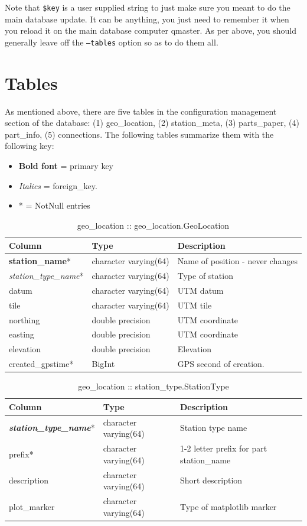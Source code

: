 \documentclass{article}
\begin{document}
Note that {\tt \$key} is a user supplied string to just make sure you meant to do the main database update.  It can be anything, you
just need to remember it when you reload it on the main database computer qmaster.
As per above, you should generally leave off the {\tt --tables} option so as to do them all.  

\section{Tables}
As mentioned above, there are five tables in the configuration management section of the database:  (1) geo\_location, (2) station\_meta,
(3) parts\_paper, (4) part\_info, (5) connections.  The following tables summarize them with the following key:  
\begin{itemize}\setlength\itemsep{-.3em}
	\item {\bf Bold font} = primary key
	\item {\em Italics} = foreign\_key.
	\item * = NotNull entries
\end{itemize}

\begin{table}[h]
\centering
\caption{geo\_location :: geo\_location.GeoLocation}
\begin{tabular}{| l | l | l |} \hline
{\bf Column} & {\bf Type} & {\bf Description} \\ \hline
{\bf station\_name}*  & character varying(64) & Name of position - never changes \\ \hline
{\em station\_type\_name}* & character varying(64) & Type of station \\ \hline
datum & character varying(64) & UTM datum \\ \hline
tile & character varying(64) & UTM tile \\ \hline
northing & double precision & UTM coordinate \\ \hline
easting & double precision & UTM coordinate \\ \hline
elevation & double precision & Elevation \\ \hline
created\_gpstime* & BigInt & GPS second of creation. \\ \hline
\end{tabular}
\end{table}

\begin{table}[h]
\centering
\caption{geo\_location :: station\_type.StationType}
\begin{tabular}{| l | l | l |} \hline
{\bf Column} & {\bf Type} & {\bf Description} \\ \hline
{\bf \em station\_type\_name}* &  character varying(64) &  Station type name \\ \hline
prefix* & character varying(64) & 1-2 letter prefix for part station\_name \\ \hline
description & character varying(64) &  Short description \\ \hline
plot\_marker & character varying(64) & Type of matplotlib marker \\ \hline
\end{tabular}
\end{table}
\end{document}
